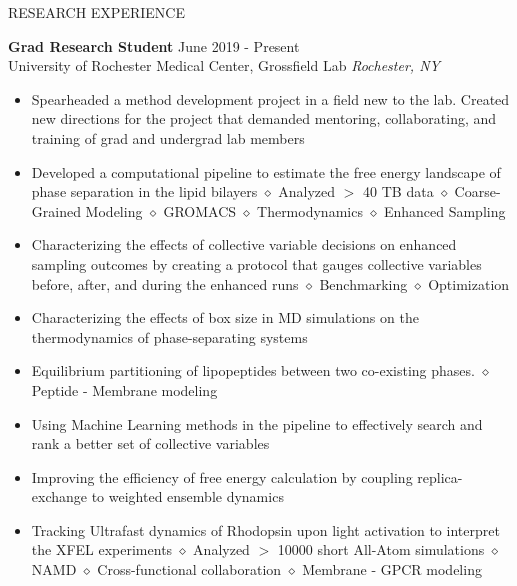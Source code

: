 \documentclass{resume} %
\begin{document}

\begin{rSection}{RESEARCH EXPERIENCE}

\textbf{Grad Research Student} \hfill June 2019 - Present\\
University of Rochester Medical Center, Grossfield Lab \hfill \textit{Rochester, NY}
 \begin{itemize}
    \itemsep -3pt {}
    \item Spearheaded a method development project in a field new to the lab. Created new directions for the project that demanded mentoring, collaborating, and training of grad and undergrad lab members
     \item Developed a computational pipeline to estimate the free energy landscape of phase separation in the lipid bilayers $\diamond$ Analyzed $>$ 40 TB data
     $\diamond$ Coarse-Grained Modeling $\diamond$ GROMACS  $\diamond$ Thermodynamics $\diamond$ Enhanced Sampling
     \item Characterizing the effects of collective variable decisions on enhanced sampling outcomes by creating a protocol that gauges collective variables before, after, and during the enhanced runs
     $\diamond$ Benchmarking $\diamond$ Optimization   
    \item Characterizing the effects of box size in MD simulations on the thermodynamics of phase-separating systems
    \item Equilibrium partitioning of lipopeptides between two co-existing phases. $\diamond$ Peptide - Membrane modeling
    \item Using Machine Learning methods in the pipeline to effectively search and rank a better set of collective variables
    \item Improving the efficiency of free energy calculation by coupling replica-exchange to weighted ensemble dynamics
    \item Tracking Ultrafast dynamics of Rhodopsin upon light activation to interpret the XFEL experiments $\diamond$ Analyzed $>$ 10000 short All-Atom simulations
    $\diamond$ NAMD $\diamond$ Cross-functional collaboration $\diamond$  Membrane - GPCR modeling
 \end{itemize}
 

\end{rSection}
\end{document}
